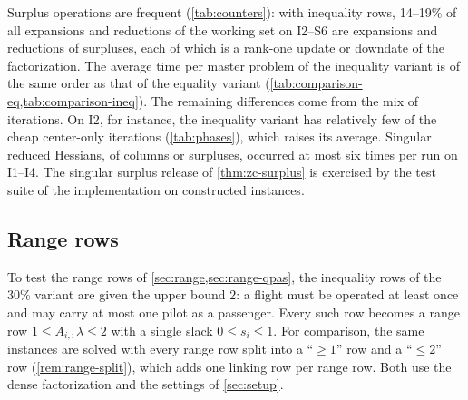 \medskip

Surplus operations are frequent (\cref{tab:counters}): with inequality rows, 14--19\% of all
expansions and reductions of the working set on I2--S6 are expansions and reductions of
surpluses, each of which is a rank-one update or downdate of the factorization. The average
time per master problem of the inequality variant is of the same order as that of the equality
variant (\cref{tab:comparison-eq,tab:comparison-ineq}). The remaining differences come from the
mix of iterations. On I2, for instance, the inequality variant has relatively few of the cheap
center-only iterations (\cref{tab:phases}), which raises its average. Singular reduced
Hessians, of columns or surpluses, occurred at most six times per run on I1--I4. The singular
surplus release of \cref{thm:zc-surplus} is exercised by the test suite of the implementation
on constructed instances.

\subsection{Range rows}
\label{sec:results-range}

To test the range rows of \cref{sec:range,sec:range-qpas}, the inequality rows of the
30\% variant are given the upper bound $2$: a flight must be operated at least once and may
carry at most one pilot as a passenger. Every such row becomes a range row
$1\le A_{i,:}\lambda\le 2$ with a single slack $0\le s_i\le 1$. For comparison, the same
instances are solved with every range row split into a ``$\ge 1$'' row and a ``$\le 2$'' row
(\cref{rem:range-split}), which adds one linking row per range row. Both use the dense
factorization and the settings of \cref{sec:setup}.

\begin{table}[ht]
\centering
\small
\renewcommand{\arraystretch}{1.15}
\setlength{\tabcolsep}{4pt}
\caption{Range rows $1\le A_{i,:}\lambda\le 2$ on the inequality rows of the 30\% variant.
$z^\star$: optimum of the full linear program with the rows ``$\ge 1$'' and with the range rows.
CG iterations with the column-adding iterations in parentheses; flips: bound flips
(\cref{thm:flip-expand}); cost error of the single-slack run.}
\label{tab:range}
\end{table}

